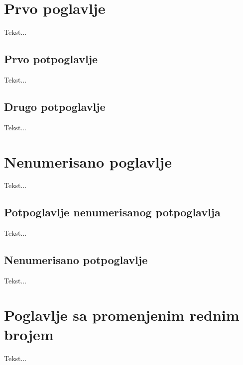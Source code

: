 \documentclass{article}
\begin{document}
\section{Prvo poglavlje}
Tekst...
\subsection{Prvo potpoglavlje}
Tekst...
\subsection{Drugo potpoglavlje}
Tekst...
\section*{Nenumerisano poglavlje}
Tekst...
\subsection{Potpoglavlje nenumerisanog potpoglavlja}
Tekst...
\subsection*{Nenumerisano potpoglavlje}
Tekst...
\setcounter{section}{9}
\section{Poglavlje sa promenjenim rednim brojem}
Tekst...
\tableofcontents
\end{document}
